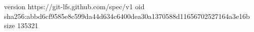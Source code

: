version https://git-lfs.github.com/spec/v1
oid sha256:abbd6cf9585e8c599da44d634c6400dea30a1370588d11656702527164a3e16b
size 135321
